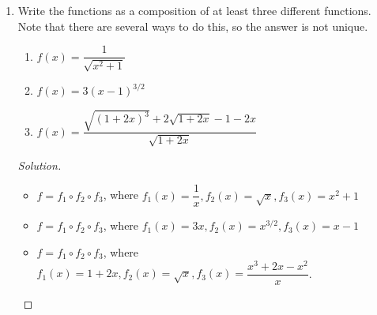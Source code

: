 \documentclass[12pt]{article}
\newenvironment{solution}{\begin{proof}[Solution]}{\end{proof}}
\begin{document}
\begin{enumerate}
		
		\begin{enumerate}
			\item $(f+g)(-2),(fg)(0),\dfrac{f}{g}(1),\dfrac{g}{f}(1)$
			\item $f\circ g(-2), g\circ f(0),g\circ g(1), f\circ f(2)$
		\end{enumerate}
		
		\begin{solution}
			\begin{itemize}
				\item[(a)] $(f+g)(-2)=f(-2)+g(-2)=-3+(-4)=-7,\\
				(fg)(0) \text{ is undefined since } g(0) \text{ is undefined,}\\
				\dfrac{f}{g}(1) \text{ is undefined since } g(1)=0\\
				\dfrac{g}{f}(1)=\dfrac{g(1)}{f(1)}=\dfrac{0}{1}=0$.
				\item[(b)] $f\circ g(-2)=f(g(-2))=f(-4) \text{ cannot be determined based on the image},\\
				g\circ f(0)=g(f(0))=g(1)=0,\\
				g\circ g(1)=g(g(1))=g(0) \text{ is undefined},\\
				f\circ f(2)=f(f(2))=f(2)=2$.
			\end{itemize}
		\end{solution}
		
		\item Write the functions as a composition of at least three different functions. Note that there are several ways to do this, so the answer is not unique.
		\begin{enumerate}
			\item $f(x)=\dfrac{1}{\sqrt{x^2+1}}$
			
			\item $f(x)=3(x-1)^{3/2}$
			
			\item $f(x)=\dfrac{\sqrt{(1+2x)^3}+2\sqrt{1+2x}-1-2x}{\sqrt{1+2x}}$
		
		\end{enumerate}
		
		\begin{solution}
			\begin{itemize}
				\item[(a)] 	$f=f_1\circ f_2 \circ f_3$, where $f_1(x)=\dfrac{1}{x},f_2(x)=\sqrt{x},f_3(x)=x^2+1$
				\item[(b)] 	$f=f_1\circ f_2 \circ f_3$, where $f_1(x)=3x,f_2(x)=x^{3/2},f_3(x)=x-1$
				\item[(c)] 	$f=f_1\circ f_2 \circ f_3$, where $f_1(x)=1+2x,f_2(x)=\sqrt{x},f_3(x)=\dfrac{x^3+2x-x^2}{x}$.
			\end{itemize}
		\end{solution}
		

\end{enumerate}
\end{document}
